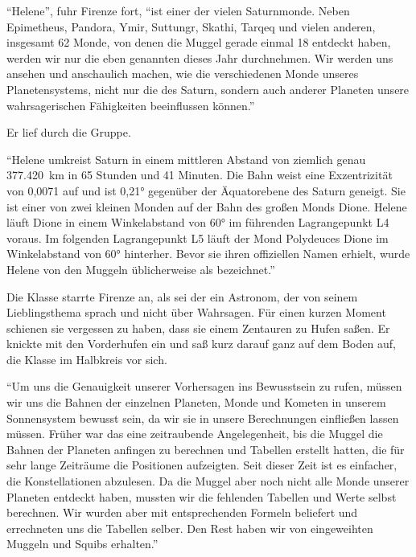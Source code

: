 \enquote{Helene}, fuhr Firenze fort, \enquote{ist einer der vielen Saturnmonde. Neben Epimetheus, Pandora, Ymir, Suttungr, Skathi, Tarqeq und vielen anderen, insgesamt 62 Monde, von denen die Muggel gerade einmal 18 entdeckt haben, werden wir nur die eben genannten dieses Jahr durchnehmen. Wir werden uns ansehen und anschaulich machen, wie die verschiedenen Monde unseres Planetensystems, nicht nur die des Saturn, sondern auch anderer Planeten unsere wahrsagerischen Fähigkeiten beeinflussen können.}

Er lief durch die Gruppe.

\enquote{Helene umkreist Saturn in einem mittleren Abstand von ziemlich genau 377.420~km in 65 Stunden und 41 Minuten. Die Bahn weist eine Exzentrizität von 0,0071 auf und ist 0,21° gegenüber der Äquatorebene des Saturn geneigt. \gst Sie ist einer von zwei kleinen Monden auf der Bahn des großen Monds Dione. Helene läuft Dione in einem Winkelabstand von 60° im führenden Lagrangepunkt L4 voraus. Im folgenden Lagrangepunkt L5 läuft der Mond Polydeuces Dione im Winkelabstand von 60° hinterher. \gst Bevor sie ihren offiziellen Namen erhielt, wurde Helene von den Muggeln üblicherweise als  bezeichnet.}

Die Klasse starrte Firenze an, als sei der ein Astronom, der von seinem Lieblingsthema  sprach und nicht über Wahrsagen. Für einen kurzen Moment schienen sie vergessen zu haben, dass sie einem Zentauren zu Hufen saßen. Er knickte mit den Vorderhufen ein und saß kurz darauf ganz auf dem Boden auf, die Klasse im Halbkreis vor sich.

\enquote{Um uns die Genauigkeit unserer Vorhersagen ins Bewusstsein zu rufen, müssen wir uns die Bahnen der einzelnen Planeten, Monde und Kometen in unserem Sonnensystem bewusst sein, da wir sie in unsere Berechnungen einfließen lassen müssen. \gst Früher war das eine zeitraubende Angelegenheit, bis die Muggel die Bahnen der Planeten anfingen zu berechnen und Tabellen erstellt hatten, die für sehr lange Zeiträume die Positionen aufzeigten. Seit dieser Zeit ist es einfacher, die Konstellationen abzulesen. Da die Muggel aber noch nicht alle Monde unserer Planeten entdeckt haben, mussten wir die fehlenden Tabellen und Werte selbst berechnen. Wir wurden aber mit entsprechenden Formeln beliefert und errechneten uns die Tabellen selber. Den Rest haben wir von eingeweihten Muggeln und Squibs erhalten.}


